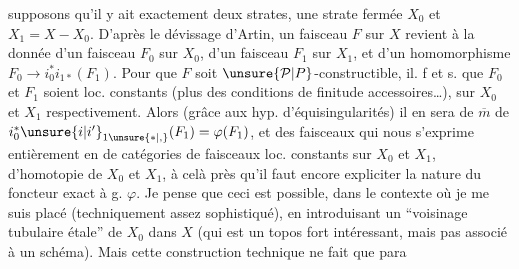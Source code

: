 supposons qu'il y ait exactement deux strates, une strate fermée $X_0$ et $X_1=X-X_0$. D'après le dévissage d'Artin, un faisceau $F$ sur $X$ revient à la donnée d'un faisceau $F_0$  sur $X_0$, d'un faisceau $F_1$  sur $X_1$, et d'un homomorphisme $F_0\longrightarrow i_0^*i_{1*}(F_1)$. Pour que $F$
\reversemarginpar
{}%
\normalmarginpar
soit $\unsure{\mathcal P|P}$-constructible, il. f et s. que $F_0$ et $F_1$ soient loc. constants (plus des conditions de finitude accessoires\ldots), sur $X_0$ et $X_1$ respectivement. Alors (grâce aux hyp. d'équisingularités) il en sera de $\overline m$ de $i_0^*\unsure{i|i'}_{1\unsure{*|,}}(F_1)=\varphi(F_1)$, et  des faisceaux qui nous  s'exprime entièrement en   de catégories de faisceaux loc. constants sur $X_0$ et $X_1$,   d'homotopie de $X_0$ et $X_1$, à celà près qu'il faut encore expliciter la nature du foncteur exact à g. $\varphi$. Je pense que ceci est possible, dans le contexte  où je me suis placé (techniquement assez sophistiqué), en introduisant un ``voisinage tubulaire étale'' de $X_0$ dans $X$ (qui est un topos fort intéressant, mais pas associé à un schéma). Mais cette construction technique ne fait que para%
